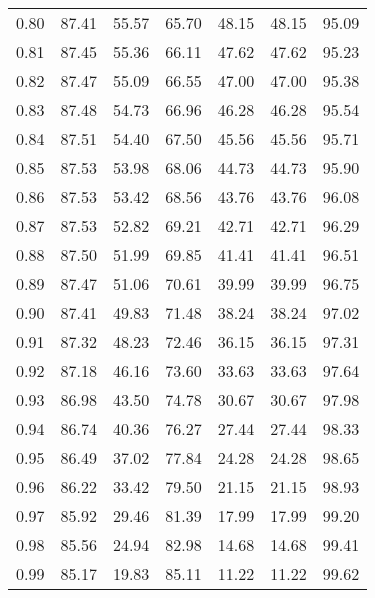 \begin{tabular}{|c|c|c|c|c|c|c|}
      0.80 &     87.41 &     55.57 &      65.70 &   48.15 &      48.15 &         95.09 \\
      0.81 &     87.45 &     55.36 &      66.11 &   47.62 &      47.62 &         95.23 \\
      0.82 &     87.47 &     55.09 &      66.55 &   47.00 &      47.00 &         95.38 \\
      0.83 &     87.48 &     54.73 &      66.96 &   46.28 &      46.28 &         95.54 \\
      0.84 &     87.51 &     54.40 &      67.50 &   45.56 &      45.56 &         95.71 \\
      0.85 &     87.53 &     53.98 &      68.06 &   44.73 &      44.73 &         95.90 \\
      0.86 &     87.53 &     53.42 &      68.56 &   43.76 &      43.76 &         96.08 \\
      0.87 &     87.53 &     52.82 &      69.21 &   42.71 &      42.71 &         96.29 \\
      0.88 &     87.50 &     51.99 &      69.85 &   41.41 &      41.41 &         96.51 \\
      0.89 &     87.47 &     51.06 &      70.61 &   39.99 &      39.99 &         96.75 \\
      0.90 &     87.41 &     49.83 &      71.48 &   38.24 &      38.24 &         97.02 \\
      0.91 &     87.32 &     48.23 &      72.46 &   36.15 &      36.15 &         97.31 \\
      0.92 &     87.18 &     46.16 &      73.60 &   33.63 &      33.63 &         97.64 \\
      0.93 &     86.98 &     43.50 &      74.78 &   30.67 &      30.67 &         97.98 \\
      0.94 &     86.74 &     40.36 &      76.27 &   27.44 &      27.44 &         98.33 \\
      0.95 &     86.49 &     37.02 &      77.84 &   24.28 &      24.28 &         98.65 \\
      0.96 &     86.22 &     33.42 &      79.50 &   21.15 &      21.15 &         98.93 \\
      0.97 &     85.92 &     29.46 &      81.39 &   17.99 &      17.99 &         99.20 \\
      0.98 &     85.56 &     24.94 &      82.98 &   14.68 &      14.68 &         99.41 \\
      0.99 &     85.17 &     19.83 &      85.11 &   11.22 &      11.22 &         99.62 \\
\bottomrule
\end{tabular}
